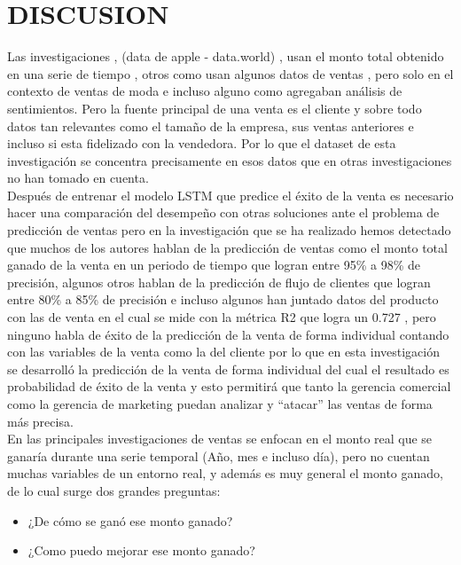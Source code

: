 \documentclass[conference]{IEEEtran}
\begin{document}
\section{DISCUSION}
Las investigaciones \cite{b3}, \cite{b4} (data de apple - data.world) , \cite{b20} usan el monto total obtenido en una serie de tiempo  , otros como \cite{b22} usan algunos datos de ventas , pero solo en el contexto de ventas de moda e incluso alguno como \cite{b24} agregaban análisis de sentimientos. Pero la fuente principal de una venta es el cliente y sobre todo datos tan relevantes como el tamaño de la empresa, sus ventas anteriores e incluso si esta fidelizado con la vendedora. Por lo que el dataset de esta investigación se concentra precisamente en esos datos que en otras investigaciones no han tomado en cuenta.\\
Después de entrenar el modelo LSTM que predice el éxito de la venta es necesario hacer una comparación del desempeño con otras soluciones ante el problema de predicción de ventas pero en la investigación que se ha realizado hemos detectado que muchos de los autores hablan de la predicción de ventas como el monto total ganado de la venta en un periodo de tiempo\cite{b2}\cite{b5}\cite{b6} que logran entre 95\% a 98\% de precisión, algunos otros hablan de la predicción de flujo de clientes\cite{b11}\cite{b12}\cite{b13}\cite{b14} que logran entre 80\% a 85\% de precisión  e incluso algunos han juntado datos del producto\cite{b1} con las de venta  en el cual se mide con la métrica R2 que logra un 0.727 , pero ninguno habla de éxito de la predicción de la venta de forma individual contando con las variables de la venta como la del cliente por lo que en esta investigación se desarrolló la predicción de la venta de forma individual del cual el resultado es probabilidad de éxito de la venta y esto permitirá que tanto la gerencia comercial como la gerencia de marketing puedan analizar y “atacar” las ventas de forma más precisa.\\
En las principales investigaciones de ventas \cite{b2}\cite{b5}\cite{b6}\cite{b1} se enfocan en el monto real que se ganaría durante una serie temporal (Año, mes e incluso día), pero no cuentan muchas variables de un entorno real, y además es muy general el monto ganado, de lo cual surge dos grandes preguntas:
\begin{itemize}
\item ¿De cómo se ganó ese monto ganado?
\item ¿Como puedo mejorar ese monto ganado?
\end{itemize}
\end{document}
